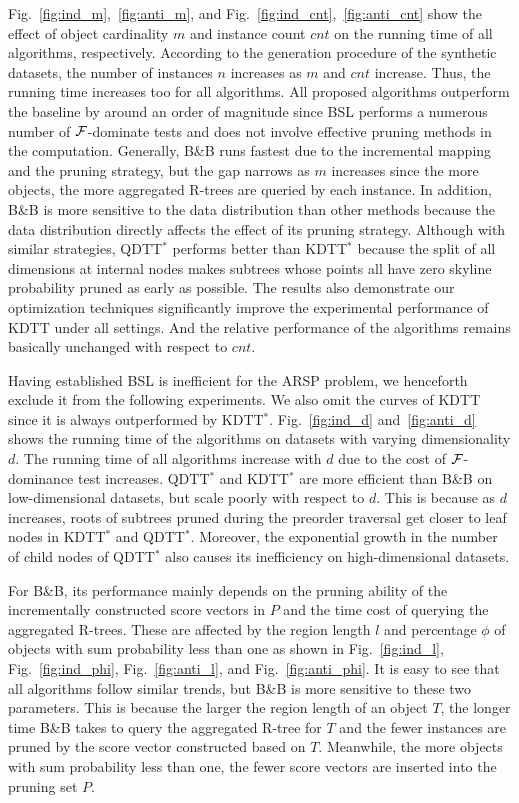 Fig.~\ref{fig:ind_m},~\ref{fig:anti_m}, and Fig.~\ref{fig:ind_cnt},~\ref{fig:anti_cnt} show the effect of object cardinality $m$ and instance count $cnt$ on the running time of all algorithms, respectively.
According to the generation procedure of the synthetic datasets, the number of instances $n$ increases as $m$ and $cnt$ increase.
Thus, the running time increases too for all algorithms.
All proposed algorithms outperform the baseline by around an order of magnitude since \textsc{BSL} performs a numerous number of $\mathcal{F}$-dominate tests and does not involve effective pruning methods in the computation.
Generally, \textsc{B\&B} runs fastest due to the incremental mapping and the pruning strategy, but the gap narrows as $m$ increases since the more objects, the more aggregated R-trees are queried by each instance.
In addition, \textsc{B\&B} is more sensitive to the data distribution than other methods because the data distribution directly affects the effect of its pruning strategy.
Although with similar strategies, \textsc{QDTT$^*$} performs better than \textsc{KDTT$^*$} because the split of all dimensions at internal nodes makes subtrees whose points all have zero skyline probability pruned as early as possible.
The results also demonstrate our optimization techniques significantly improve the experimental performance of \textsc{KDTT} under all settings.
And the relative performance of the algorithms remains basically unchanged with respect to $cnt$.

Having established \textsc{BSL} is inefficient for the ARSP problem, we henceforth exclude it from the following experiments.
We also omit the curves of \textsc{KDTT} since it is always outperformed by \textsc{KDTT$^*$}.
Fig.~\ref{fig:ind_d} and~\ref{fig:anti_d} shows the running time of the algorithms on datasets with varying dimensionality $d$.
The running time of all algorithms increase with $d$ due to the cost of $\mathcal{F}$-dominance test increases.
\textsc{QDTT$^*$} and \textsc{KDTT$^*$} are more efficient than \textsc{B\&B} on low-dimensional datasets, but scale poorly with respect to $d$.
This is because as $d$ increases, roots of subtrees pruned during the preorder traversal get closer to leaf nodes in \textsc{KDTT$^*$} and \textsc{QDTT$^*$}.
Moreover, the exponential growth in the number of child nodes of \textsc{QDTT$^*$} also causes its inefficiency on high-dimensional datasets.

For \textsc{B\&B}, its performance mainly depends on the pruning ability of the incrementally constructed score vectors in $P$ and the time cost of querying the aggregated R-trees.
These are affected by the region length $l$ and percentage $\phi$ of objects with sum probability less than one as shown in Fig.~\ref{fig:ind_l}, Fig.~\ref{fig:ind_phi}, Fig.~\ref{fig:anti_l}, and Fig.~\ref{fig:anti_phi}.
It is easy to see that all algorithms follow similar trends, but \textsc{B\&B} is more sensitive to these two parameters.
This is because the larger the region length of an object $T$, the longer time \textsc{B\&B} takes to query the aggregated R-tree for $T$ and the fewer instances are pruned by the score vector constructed based on $T$.
Meanwhile, the more objects with sum probability less than one, the fewer score vectors are inserted into the pruning set $P$.

